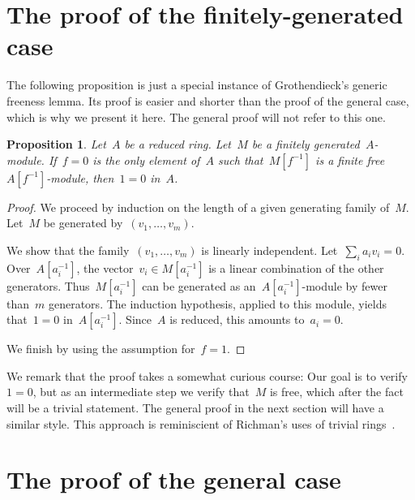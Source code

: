 \documentclass[oneside]{amsart}
\theoremstyle{definition}
\theoremstyle{plain}
\newtheorem{prop}[defn]{Proposition}
\theoremstyle{remark}
\begin{document}
\section{The proof of the finitely-generated case}

The following proposition is just a special instance of Grothendieck's generic
freeness lemma. Its proof is easier and shorter than the proof of the general
case, which is why we present it here. The general proof
will not refer to this one.

\begin{prop}Let~$A$ be a reduced ring. Let~$M$ be a finitely
generated~$A$-module. If~$f = 0$ is the only element of~$A$ such
that~$M[f^{-1}]$ is a finite free~$A[f^{-1}]$-module, then~$1 = 0$ in~$A$.
\end{prop}

\begin{proof}We proceed by induction on the length of a given generating family
of~$M$. Let~$M$ be generated by~$(v_1,\ldots,v_m)$.

We show that the family~$(v_1,\ldots,v_m)$ is linearly independent. Let~$\sum_i
a_i v_i = 0$. Over~$A[a_i^{-1}]$, the vector~$v_i \in M[a_i^{-1}]$ is a linear
combination of the other generators. Thus~$M[a_i^{-1}]$ can be generated as
an~$A[a_i^{-1}]$-module by fewer than~$m$ generators. The induction hypothesis,
applied to this module, yields that~$1 = 0$ in~$A[a_i^{-1}]$. Since~$A$ is
reduced, this amounts to~$a_i = 0$.

We finish by using the assumption for~$f = 1$.
\end{proof}

We remark that the proof takes a somewhat curious course: Our goal is to
verify~$1 = 0$, but as an intermediate step we verify that~$M$ is free, which
after the fact will be a trivial statement. The general proof in the next
section will have a similar style. This approach is reminiscient of
Richman's uses of trivial rings~\cite{richman:trivial-rings}.


\section{The proof of the general case}
\end{document}
